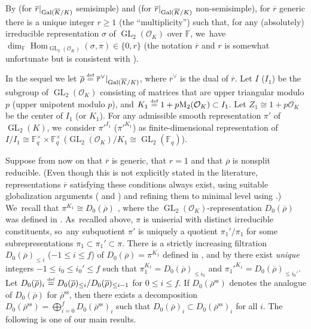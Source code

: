\documentclass[JEP,XML,SOM,Unicode,NoFloatCountersInSection, NoEqCountersInSection,published]{cedram}
\let\ovl\overline
\newcommand{\defeq}{\stackrel{\textrm{\tiny{\upshape{def}}}}{=}}
\newcommand{\F}{\mathbb{F}}
\newcommand{\cO}{\mathcal{O}}
\renewcommand{\ss}{\mathrm{ss}}
\newcommand{\rbar}{\overline{r}}
\newcommand{\rhobar}{\overline{\rho}}
\newcommand{\brho}{\overline{\rho}}
\newcommand{\s}{^\times}
\DeclareMathOperator{\GL}{GL}
\DeclareMathOperator{\Hom}{Hom}
\theoremstyle{plain}
\theoremstyle{definition}
\begin{document}
By \cite[Th.\,1.9]{BHHMS1} (for $\rbar\vert_{{\rm Gal}(\ovl K/K)}$ semisimple) and \cite[Th.\,6.3(ii)]{YitongWangGKD} (for $\rbar\vert_{{\rm Gal}(\ovl K/K)}$ non-semisimple), for $\rbar$ generic there is a unique integer $r\geq 1$ (the ``multiplicity'') such that, for any (absolutely) irreducible representation $\sigma$ of $\GL_2(\cO_K)$ over $\F$, we~have $\dim_{\F}\Hom_{\GL_2(\cO_K)}(\sigma, \pi)\in \{0, r\}$ (the notation $\ovl r$ and $r$ is somewhat unfortunate but is consistent with \cite[\S 8]{BHHMS1}).

In the sequel we let $\rhobar\defeq \rbar^\vee\vert_{{\rm Gal}(\ovl K/K)}$, where $\rbar^\vee$ is the dual of $\rbar$.
Let $I$ (\resp $I_1$) be the subgroup of $\GL_2(\cO_K)$ consisting of matrices that are upper triangular modulo $p$ (\resp upper unipotent modulo $p$), and $K_1\defeq 1+p{\rm M}_2(\cO_K) \subset I_1$.
Let $Z_1\cong 1+p\cO_K$ be the center of $I_1$ (or $K_1$).
For any admissible smooth representation $\pi'$ of $\GL_2(K)$, we~consider $\pi'^{I_1}$ (\resp $\pi'^{K_1}$) as finite-dimensional representation of $I/I_1 \cong \F_q\s \times \F_q\s$ (\resp $\GL_2(\cO_K)/K_1 \cong \GL_2(\F_q)$).

Suppose from now on that $\rbar$ is generic, that $r=1$ and that $\rhobar$ is nonsplit reducible.
(Even though this is not explicitly stated in the literature, representations $\rbar$ satisfying these conditions always exist, using suitable globalization arguments (\eg \cite[Cor.\,A.3]{gee-kisin} and \cite[App.\,B]{EGS}) and refining them to minimal level using \cite[\S 3.3]{BD}.)
We~recall that $\pi^{K_1} \cong D_0(\brho)$ \cite{LMS, HuWang, DanWild}, where the $\GL_2(\cO_K)$-representation $D_0(\brho)$ was defined in \cite[Th.\,13.8]{BP}. As~recalled above, $\pi$ is uniserial with distinct irreducible constituents, so~any subquotient $\pi'$ is uniquely a quotient $\pi_1'/\pi_1$ for some subrepresentations $\pi_1 \subset \pi_1' \subset \pi$.
There is a strictly increasing filtration $D_0(\brho)_{\le i}$ ($-1 \le i \le f$) of $D_0(\brho) = \pi^{K_1}$ defined in \cite[Prop.\,5.2]{Hu-SMF}, and by \cite[Th.\,4.3.15]{BHHMS4} there exist \emph{unique} integers $-1 \le i_0 \le i_0' \le f$ such that $\pi_1^{K_1} = D_0(\brho)_{\le i_0}$ and $\pi_1'^{K_1} = D_0(\brho)_{\le i_0'}$.
Let $D_0(\brho)_i \defeq D_0(\brho)_{\leq i}/D_0(\brho)_{\leq i-1}$ for $0 \le i \le f$.
If $D_0(\brho^\ss)$ denotes the analogue of $D_0(\brho)$ for $\brho^\ss$, then there exists a decomposition $D_0(\brho^\ss) = \bigoplus_{i=0}^f D_0(\brho^\ss)_i$ \cite[Th.\,15.4]{BP} such that $D_0(\brho)_i \subset D_0(\brho^\ss)_i$ for all $i$.
The following is one of our main results.
\end{document}
